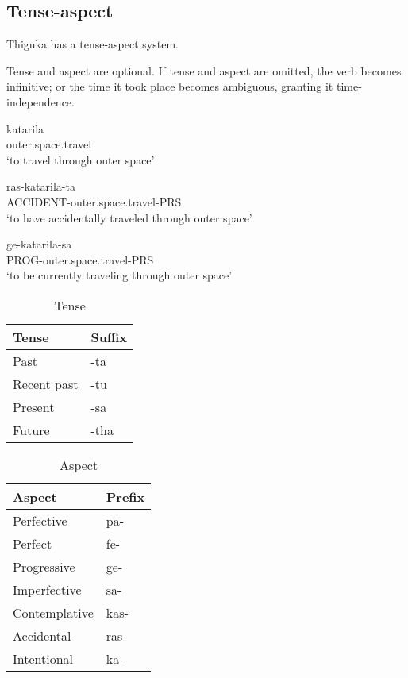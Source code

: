 \subsection{Tense-aspect}
Thiguka has a tense-aspect system.

Tense and aspect are optional.
If tense and aspect are omitted, the verb becomes infinitive; or the time
it took place becomes ambiguous, granting it time-independence.

\begin{exe}
    \ex{} \gll{}katarila\\
    outer.space.travel\\
    \glt{}`to travel through outer space'
\end{exe}

\begin{exe}
    \ex{} \gll{}ras-katarila-ta\\
    ACCIDENT-outer.space.travel-PRS\\
    \glt{}`to have accidentally traveled through outer space'
\end{exe}

\begin{exe}
    \ex{} \gll{}ge-katarila-sa\\
    PROG-outer.space.travel-PRS\\
    \glt{}`to be currently traveling through outer space'
\end{exe}

\begin{table}[h!]
    \centering
    \caption{Tense}
    \begin{tabularx}{8cm}{|X|X|}
        \hline
        \textbf{Tense} & \textbf{Suffix} \\
        \hline
        Past & -ta \\
        Recent past & -tu \\
        Present & -sa \\
        Future & -tha \\
        \hline
    \end{tabularx}
\end{table}

\begin{table}[h!]
    \centering
    \caption{Aspect}
    \begin{tabularx}{8cm}{|X|X|}
        \hline
        \textbf{Aspect} & \textbf{Prefix} \\
        \hline
        Perfective & pa- \\
        Perfect & fe- \\
        Progressive & ge- \\
        Imperfective & sa- \\
        Contemplative & kas- \\
        Accidental & ras- \\
        Intentional & ka- \\
        \hline
    \end{tabularx}
\end{table}

